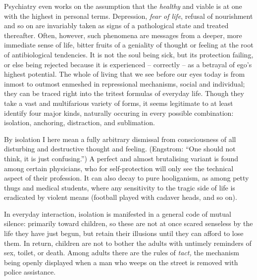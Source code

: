 \documentclass[draft,a4paper,10pt,twocolumn]{article}
\begin{document}
Psychiatry even works on the assumption that the \emph{healthy} and viable is at one with the highest in personal terms. Depression, \emph{fear of life}, refusal of nourishment and so on are invariably taken as signs of a pathological state and treated thereafter. Often, however, such phenomena are messages from a deeper, more immediate sense of life, bitter fruits of a geniality of thought or feeling at the root of antibiological tendencies. It is not the soul being sick, but its protection failing, or else being rejected because it is experienced -- correctly -- as a betrayal of ego's highest potential. The whole of living that we see before our eyes today is from inmost to outmost enmeshed in repressional mechanisms, social and individual; they can be traced right into the tritest formulas of everyday life. Though they take a vast and multifarious variety of forms, it seems legitimate to at least identify four major kinds, naturally occuring in every possible combination: isolation, anchoring, distraction, and sublimation.

By isolation I here mean a fully arbitrary dismissal from consciousness of all
disturbing and destructive thought and feeling. (Engstrom: \enquote{One should
not think, it is just confusing.}) A perfect and almost brutalising variant is found among certain physicians, who for self-protection will only see the technical aspect of their profession. It can also decay to pure hooliganism, as among petty thugs and medical students, where any sensitivity to the tragic side of life is eradicated by violent means (football played with cadaver heads, and so on).

In everyday interaction, isolation is manifested in a general code of mutual silence: primarily toward children, so these are not at once scared senseless by the life they have just begun, but retain their illusions until they can afford to lose them. In return, children are not to bother the adults with untimely reminders of sex, toilet, or death. Among adults there are the rules of \emph{tact,} the mechanism being openly displayed when a man who weeps on the street is removed with police assistance.
\end{document}

